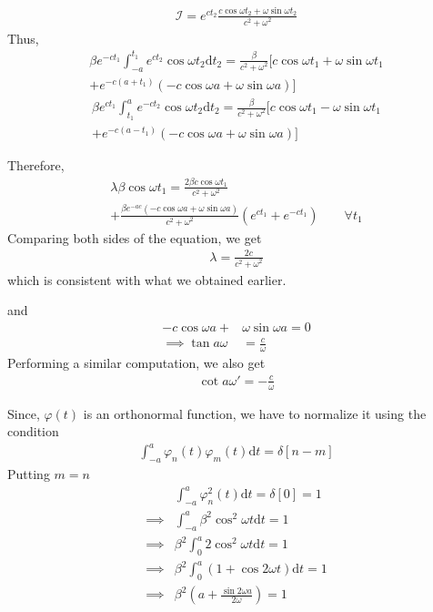 \documentclass{beamer}
\providecommand{\brak}[1]{\ensuremath{\left(#1\right)}}
\begin{document}
	\begin{frame}
	\begin{align}
		\mathcal{I} = e^{ct_2} \frac{c\cos\omega t_2 + \omega\sin\omega t_2}{c^2 + \omega^2}
	\end{align}
	Thus,
	\begin{multline}
		\beta e^{-ct_1}\int_{-a}^{t_1} e^{ct_2}\cos\omega t_2 \mathrm{d}t_2 = \frac{\beta}{c^2 + \omega^2} [c\cos\omega t_1 + \omega\sin\omega t_1 \\+ e^{-c(a+t_1)}(-c\cos\omega a + \omega\sin\omega a)]
	\end{multline}
	\begin{multline}
		\beta e^{ct_1} \int_{t_1}^{a} e^{-ct_2}\cos\omega t_2 \mathrm{d}t_2 = \frac{\beta}{c^2 + \omega^2} [c\cos\omega t_1 - \omega\sin\omega t_1 \\+ e^{-c(a-t_1)}(-c\cos\omega a + \omega\sin\omega a)]
	\end{multline}
	\end{frame}
	
	\begin{frame}
	Therefore, 
	\begin{multline}
		\lambda\beta\cos\omega t_1 = \frac{2\beta c\cos\omega t_1}{c^2 + \omega^2} \\+ \frac{\beta e^{-ac} (-c\cos\omega a + \omega\sin\omega a)}{c^2 + \omega^2} (e^{ct_1} + e^{-ct_1}) \qquad \forall t_1
	\end{multline}
	Comparing both sides of the equation, we get
	\begin{align}
		\lambda = \frac{2c}{c^2 + \omega^2}
	\end{align}
	which is consistent with what we obtained earlier.
	
	and
	\begin{align}
		-c\cos\omega a + &\omega\sin\omega a = 0 \\
		\implies \tan a\omega  &= \frac{c}{\omega}
	\end{align}
	Performing a similar computation, we also get
	\begin{align}
		\cot a\omega'  = -\frac{c}{\omega}
	\end{align}
	\end{frame}
	
	\begin{frame}
	Since, $\varphi(t)$ is an orthonormal function, we have to normalize it using the condition
	\begin{align}
		\int_{-a}^a \varphi_n(t)\varphi_m(t)\mathrm{d}t = \delta[n-m]
	\end{align}		
	Putting $m = n$
	\begin{align}
		&\int_{-a}^a \varphi_n^2(t)\mathrm{d}t = \delta[0] = 1 \\
		\implies &\int_{-a}^a \beta^2 \cos^2\omega t \mathrm{d}t = 1 \\
		\implies &\beta^2 \int_0^a 2\cos^2\omega t \mathrm{d}t = 1 \\
		\implies &\beta^2 \int_0^a (1 + \cos 2\omega t) \mathrm{d}t = 1 \\
		\implies &\beta^2 \brak{a + \frac{\sin2\omega a}{2\omega}} = 1
	\end{align} 
	\end{frame}
	
\end{document}
